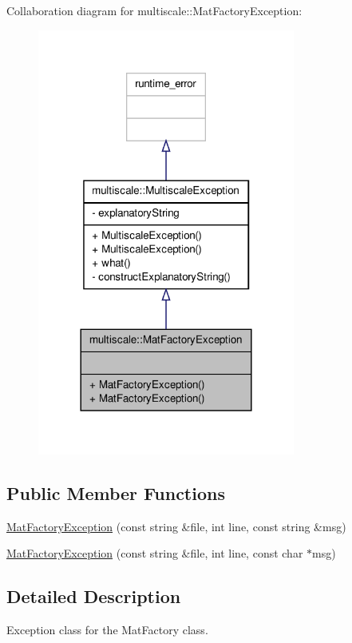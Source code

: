 Collaboration diagram for multiscale\-:\-:Mat\-Factory\-Exception\-:
\nopagebreak
\begin{figure}[H]
\begin{center}
\leavevmode
\includegraphics[width=240pt]{classmultiscale_1_1MatFactoryException__coll__graph}
\end{center}
\end{figure}
\subsection*{Public Member Functions}
\begin{DoxyCompactItemize}
\item 
\hyperlink{classmultiscale_1_1MatFactoryException_ac22ebdceb46a147d167419cd5c8bdad3}{Mat\-Factory\-Exception} (const string \&file, int line, const string \&msg)
\item 
\hyperlink{classmultiscale_1_1MatFactoryException_af164ffc6645f2584c5ecfd16980b1cc5}{Mat\-Factory\-Exception} (const string \&file, int line, const char $\ast$msg)
\end{DoxyCompactItemize}


\subsection{Detailed Description}
Exception class for the Mat\-Factory class. 

